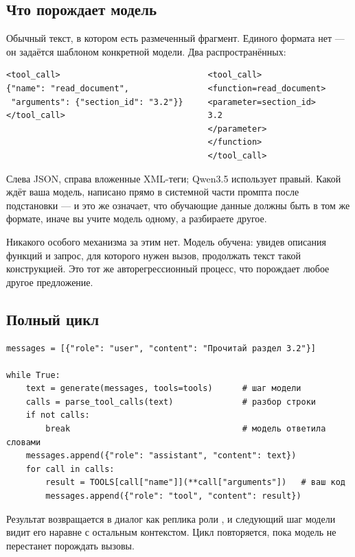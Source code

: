 \documentclass[11pt,a4paper]{article}
\begin{document}
\subsection{Что порождает модель}

Обычный текст, в котором есть размеченный фрагмент. Единого формата
нет — он задаётся шаблоном конкретной модели. Два распространённых:

\begin{Verbatim}
<tool_call>                              <tool_call>
{"name": "read_document",                <function=read_document>
 "arguments": {"section_id": "3.2"}}     <parameter=section_id>
</tool_call>                             3.2
                                         </parameter>
                                         </function>
                                         </tool_call>
\end{Verbatim}

Слева JSON, справа вложенные XML-теги; Qwen3.5 использует правый.
Какой ждёт ваша модель, написано прямо в системной части промпта после
подстановки  — и это же означает, что обучающие данные должны
быть в том же формате, иначе вы учите модель одному, а разбираете другое.

Никакого особого механизма за этим нет. Модель обучена: увидев описания
функций и запрос, для которого нужен вызов, продолжать текст такой
конструкцией. Это тот же авторегрессионный процесс, что порождает любое
другое предложение.

\subsection{Полный цикл}

\begin{Verbatim}
messages = [{"role": "user", "content": "Прочитай раздел 3.2"}]

while True:
    text = generate(messages, tools=tools)      # шаг модели
    calls = parse_tool_calls(text)              # разбор строки
    if not calls:
        break                                   # модель ответила словами
    messages.append({"role": "assistant", "content": text})
    for call in calls:
        result = TOOLS[call["name"]](**call["arguments"])   # ваш код
        messages.append({"role": "tool", "content": result})
\end{Verbatim}

Результат возвращается в диалог как реплика роли , и следующий
шаг модели видит его наравне с остальным контекстом. Цикл повторяется,
пока модель не перестанет порождать вызовы.
\end{document}
